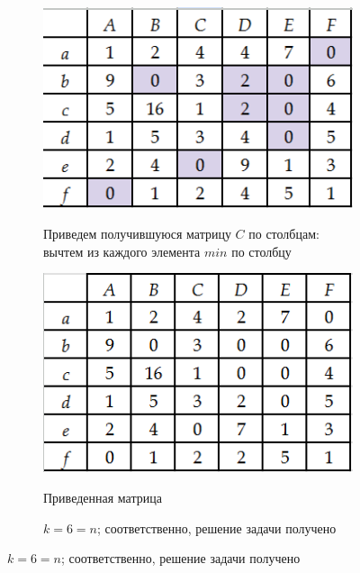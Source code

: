 \documentclass{article}
\begin{document}
\begin{enumerate}
\begin{figure}[ht]
\begin{subfigure}[b]{0.3\textwidth}
         \label{fig:10_01}
     \end{subfigure}
     \hfill
     \begin{subfigure}[b]{0.3\textwidth}
        \centering
         \caption*{\small{Приведем получившуюся матрицу $C$ по столбцам: вычтем из каждого элемента $min$ по столбцу}}
         \includegraphics[width=\textwidth]{attachments/10/02.png}
         \label{fig:10_02}
     \end{subfigure}
     \hfill
     \begin{subfigure}[b]{0.3\textwidth}
         \centering
         \caption*{\small{Приведенная матрица}}
         \includegraphics[width=\textwidth]{attachments/10/03.png}
         \label{fig:10_03}
        \end{subfigure}
    \hfill
     \begin{subfigure}[b]{0.3\textwidth}
         \centering
         \caption*{\small{$k = 6 = n$; соответственно, решение задачи получено}}

\end{subfigure}
\end{figure}
\end{enumerate}
\end{document}
